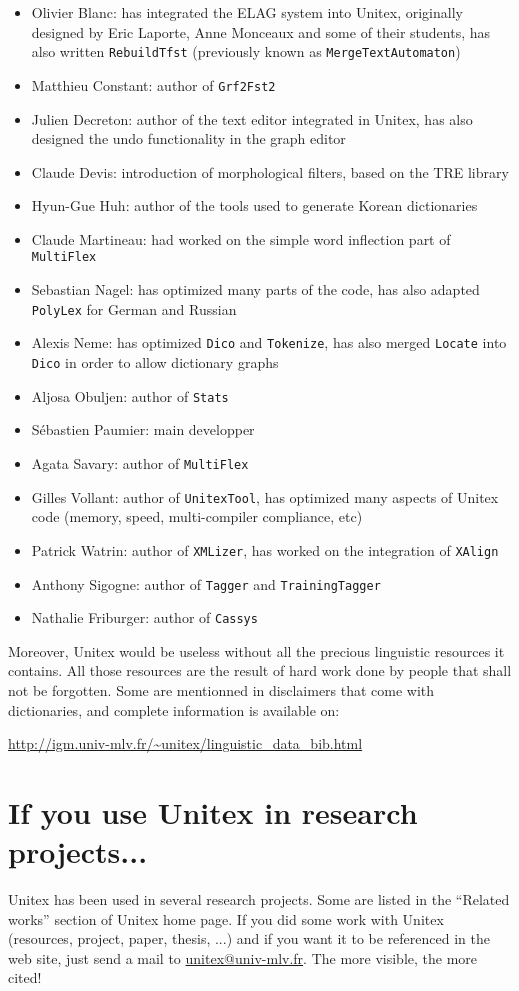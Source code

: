 \begin{itemize}
    \item Olivier Blanc: has integrated the ELAG system into Unitex, originally
    designed by Eric Laporte, Anne Monceaux and some of their students, has
    also written \verb+RebuildTfst+ (previously known as \verb+MergeTextAutomaton+)
    \item Matthieu Constant: author of \verb+Grf2Fst2+
    \item Julien Decreton: author of the text editor integrated in Unitex,
    has also designed the undo functionality in the graph editor
    \item Claude Devis: introduction of morphological filters, 
    based on the TRE library
    \item Hyun-Gue Huh: author of the tools used to
    generate Korean dictionaries
    \item Claude Martineau: had worked on the simple word inflection part of
    \verb+MultiFlex+
    \item Sebastian Nagel: has optimized many parts of the code, has also
    adapted \verb+PolyLex+ for German and Russian
    \item Alexis Neme: has optimized \verb+Dico+ and \verb+Tokenize+, has also
    merged \verb+Locate+ into \verb+Dico+ in order to allow dictionary graphs 
    \item Aljosa Obuljen: author of \verb+Stats+
    \item S\'ebastien Paumier: main developper
    \item Agata Savary: author of \verb+MultiFlex+
    \item Gilles Vollant: author of \verb+UnitexTool+, has optimized many
    aspects of Unitex code (memory, speed, multi-compiler compliance, etc)
    \item Patrick Watrin: author of \verb+XMLizer+, has worked on the
    integration of \verb+XAlign+
    \item Anthony Sigogne: author of \verb+Tagger+ and \verb+TrainingTagger+
    \item Nathalie Friburger: author of \verb+Cassys+
\end{itemize}

\bigskip
\noindent Moreover, Unitex would be useless without all the precious linguistic
resources it contains. All those resources are the result of hard work done
by people that shall not be forgotten. Some are mentionned in disclaimers that
come with dictionaries, and complete information is available on:

\bigskip
\noindent \url{http://igm.univ-mlv.fr/~unitex/linguistic_data_bib.html}


\section*{If you use Unitex in research projects...}
Unitex has been used in several research projects. Some are listed in the
``Related works'' section of Unitex home page. If you did some work with Unitex
(resources, project, paper, thesis, ...) and if you want it to be referenced in
the web site, just send a mail to \url{unitex@univ-mlv.fr}. The more visible,
the more cited!
